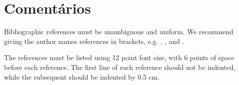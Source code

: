 \documentclass[12pt]{article}
\begin{document}
\section{Comentários}



Bibliographic references must be unambiguous and uniform.  We recommend giving
the author names references in brackets, e.g. \cite{knuth:84},
\cite{boulic:91}, and \cite{smith:99}.

The references must be listed using 12 point font size, with 6 points of space
before each reference. The first line of each reference should not be
indented, while the subsequent should be indented by 0.5 cm.



\end{document}
